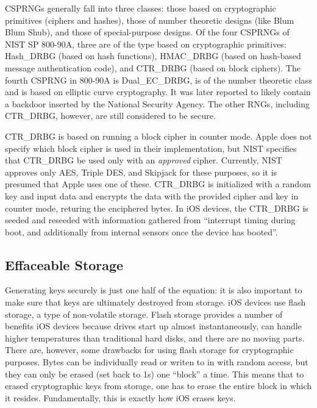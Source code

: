 CSPRNGs generally fall into three classes: those based on cryptographic
primitives (ciphers and hashes), those of number theoretic designs (like Blum
Blum Shub), and those of special-purpose designs. Of the four CSPRNGs of NIST
SP 800-90A, three are of the type based on cryptographic primitives: Hash\_DRBG
(based on hash functions), HMAC\_DRBG (based on hash-based message
authentication code), and CTR\_DRBG (based on block ciphers). The fourth CSPRNG
in 800-90A is Dual\_EC\_DRBG, is of the number theoretic class and is based on
elliptic curve cryptography. It was later reported to likely contain a backdoor
inserted by the National Security Agency\cite{goodin}. The other RNGs,
including CTR\_DRBG, however, are still considered to be secure.

CTR\_DRBG is based on running a block cipher in counter
mode\cite{nistsp80090a}. Apple does not specify which block cipher is used in
their implementation, but NIST specifies that CTR\_DRBG be used only with an
\textit{approved} cipher. Currently, NIST approves only AES, Triple DES, and
Skipjack for these purposes\cite{nistblockciphers}, so it is presumed that
Apple uses one of these. CTR\_DRBG is initialized with a random key and input
data and encrypts the data with the provided cipher and key in counter mode,
returing the enciphered bytes. In iOS devices, the CTR\_DRBG is seeded and
reseeded with information gathered from ``interrupt timing during boot, and
additionally from internal sensors once the device has booted''\cite{apple}.

\subsection{Effaceable Storage}
Generating keys securely is just one half of the equation: it is also important
to make sure that keys are ultimately destroyed from storage. iOS devices use
flash storage, a type of non-volatile storage. Flash storage provides a number
of benefits iOS devices because drives start up almost instantaneously, can
handle higher temperatures than traditional hard disks, and there are no moving
parts. There are, however, some drawbacks for using flash storage for
cryptographic purposes. Bytes can be individually read or writen to in with
random access, but they can only be erased (set back to 1s) one ``block'' a
time. This means that to erased cryptographic keys from storage, one has to
erase the entire block in which it resides. Fundamentally, this is exactly how
iOS erases keys.

